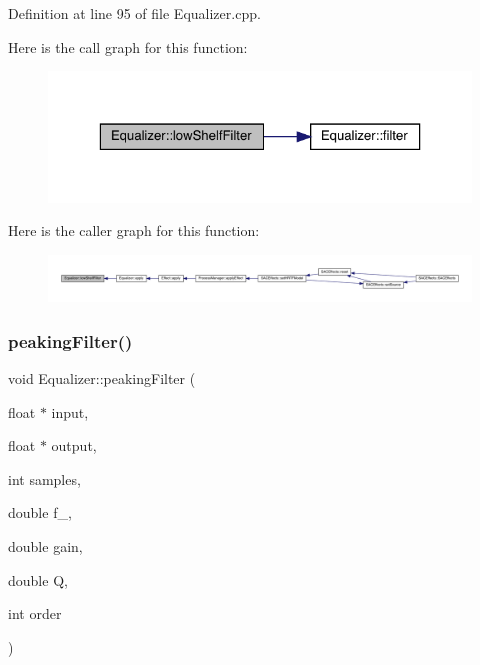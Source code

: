 Definition at line 95 of file Equalizer.\+cpp.

Here is the call graph for this function\+:
\nopagebreak
\begin{figure}[H]
\begin{center}
\leavevmode
\includegraphics[width=323pt]{class_equalizer_a45f228e5ba216af9214f9a0070d2199e_cgraph}
\end{center}
\end{figure}
Here is the caller graph for this function\+:
\nopagebreak
\begin{figure}[H]
\begin{center}
\leavevmode
\includegraphics[width=350pt]{class_equalizer_a45f228e5ba216af9214f9a0070d2199e_icgraph}
\end{center}
\end{figure}
\mbox{\label{class_equalizer_af30b0db022898105af9bee40d374fcde}} 
\subsubsection{\texorpdfstring{peaking\+Filter()}{peakingFilter()}}
{\footnotesize\ttfamily void Equalizer\+::peaking\+Filter (\begin{DoxyParamCaption}\item[{float $\ast$}]{input,  }\item[{float $\ast$}]{output,  }\item[{int}]{samples,  }\item[{double}]{f\+\_,  }\item[{double}]{gain,  }\item[{double}]{Q,  }\item[{int}]{order }\end{DoxyParamCaption})}


